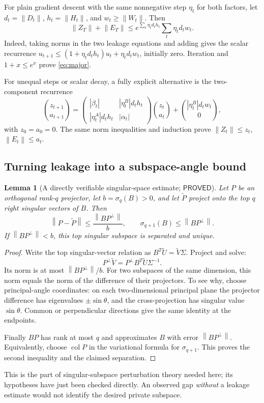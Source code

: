 \documentclass[12pt,a4paper]{article}
\theoremstyle{readable}
\newtheorem{lemma}[theorem]{Lemma}
\theoremstyle{definition}\newtheorem{example}[theorem]{Example}
\newcommand{\col}{\operatorname{col}}\newcommand{\row}{\operatorname{row}}
\newcommand{\norm}[1]{\left\|#1\right\|}
\newcommand{\PP}{\mathsf{PROVED}}\newcommand{\FF}{\mathsf{FALSE}}
\begin{document}
For plain gradient descent with the same nonnegative step \(\eta_t\) for both factors, let
\(d_t=\norm{D_t}\), \(h_t=\norm{H_t}\), and \(w_t\ge\norm{W_t}\). Then
\begin{equation}\label{eq:major}
\norm{Z_T}+\norm{E_T}
\le e^{\sum_t\eta_td_th_t}\sum_t\eta_td_tw_t.
\end{equation}
Indeed, taking norms in the two leakage equations and adding gives the scalar recurrence
\(u_{t+1}\le(1+\eta_td_th_t)u_t+\eta_td_tw_t\), initially zero. Iteration and \(1+x\le e^x\) prove \eqref{eq:major}.

For unequal steps or scalar decay, a fully explicit alternative is the two-component recurrence
\[
\binom{z_{t+1}}{a_{t+1}}=
\begin{pmatrix}|\beta_t|&|\eta_t^B|d_th_t\\|\eta_t^A|d_th_t&|\alpha_t|\end{pmatrix}
\binom{z_t}{a_t}+\binom{|\eta_t^B|d_tw_t}{0},
\]
with \(z_0=a_0=0\). The same norm inequalities and induction prove \(\norm{Z_t}\le z_t\), \(\norm{E_t}\le a_t\).

\subsection{Turning leakage into a subspace-angle bound}
\begin{lemma}[A directly verifiable singular-space estimate; \(\PP\)]\label{lem:angle}
Let \(P\) be an orthogonal rank-\(q\) projector, let \(b=\sigma_q(B)>0\), and let \(\widetilde P\) project onto the top \(q\) right singular vectors of \(B\). Then
\[
\norm{P-\widetilde P}\le\frac{\norm{BP^\perp}}b,
\qquad \sigma_{q+1}(B)\le\norm{BP^\perp}.
\]
If \(\norm{BP^\perp}<b\), this top singular subspace is separated and unique.
\end{lemma}
\begin{proof}
Write the top singular-vector relation as \(B^T\widetilde U=\widetilde V\Sigma\). Project and solve:
\[
P^\perp\widetilde V=P^\perp B^T\widetilde U\Sigma^{-1}.
\]
Its norm is at most \(\norm{BP^\perp}/b\). For two subspaces of the same dimension, this norm equals the norm of the difference of their projectors. To see why, choose principal-angle coordinates: on each two-dimensional principal plane the projector difference has eigenvalues \(\pm\sin\theta\), and the cross-projection has singular value \(\sin\theta\). Common or perpendicular directions give the same identity at the endpoints.

Finally \(BP\) has rank at most \(q\) and approximates \(B\) with error \(\norm{BP^\perp}\). Equivalently, choose \(\col P\) in the variational formula for \(\sigma_{q+1}\). This proves the second inequality and the claimed separation.
\end{proof}
This is the part of singular-subspace perturbation theory needed here; its hypotheses have just been checked directly. An observed gap \emph{without} a leakage estimate would not identify the desired private subspace.
\end{document}
